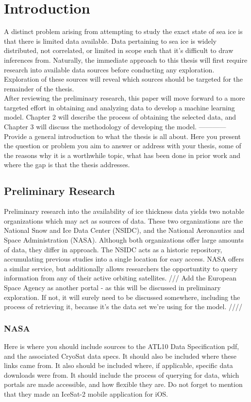 \chapter{Introduction}
\label{sec:Introduction}

A distinct problem arising from attempting to study the exact state of sea ice is that there is limited data available. Data pertaining to sea ice is widely distributed, not correlated, or limited in scope such that it's difficult to draw inferences from. Naturally, the immediate approach to this thesis will first require research into available data sources before conducting any exploration. Exploration of these sources will reveal which sources should be targeted for the remainder of the thesis.
\\
\indent After reviewing the preliminary research, this paper will move forward to a more targeted effort in obtaining and analyzing data to develop a machine learning model. Chapter 2 will describe the process of obtaining the selected data, and Chapter 3 will discuss the methodology of developing the model.
------------
\\
Provide a general introduction to what the thesis is all about. Here you present the question or problem you aim to answer or address with your thesis, some of the reasons why it is a worthwhile topic, what has been done in prior work and where the gap is that the thesis addresses.

\section{Preliminary Research}
Preliminary research into the availability of ice thickness data yields two notable organizations which may act as sources of data. These two organizations are the National Snow and Ice Data Center (NSIDC), and the National Aeronautics and Space Administration (NASA). Although both organizations offer large amounts of data, they differ in approach. The NSIDC acts as a historic repository, accumulating previous studies into a single location for easy access. NASA offers a similar service, but additionally allows researchers the opportuntity to query information from any of their active orbiting satellites.
/// Add the European Space Agency as another portal - as this will be discussed in preliminary exploration. If not, it will surely need to be discussed somewhere, including the process of retrieving it, because it's the data set we're using for the model.  ////

\subsection*{NASA}
Here is where you should include sources to the ATL10 Data Specification pdf, and the associated CryoSat data specs. It should also be included where these links came from. It also should be included where, if applicable, specific data downloads were from. It should include the process of querying for data, which portals are made accessible, and how flexible they are. Do not forget to mention that they made an IceSat-2 mobile application for iOS.

